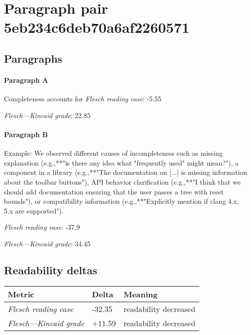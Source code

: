 \section{Paragraph pair 5eb234c6deb70a6af2260571}
\subsection{Paragraphs}
\paragraph{Paragraph A}
Completeness accounts for %
\emph{Flesch reading ease}: -5.55\par
\emph{Flesch---Kincaid grade}: 22.85

\paragraph{Paragraph B}
Example: We observed different causes of incompleteness such as missing explanation (e.g.,**"is there any idea what "frequently used" might mean?"), a component in a library (e.g.,**"The documentation on [...] is missing information about the toolbar buttons"), API behavior clarification (e.g.,**"I think that we should add documentation ensuring that the user passes a tree with reset bounds"), or compatibility information (e.g.,**"Explicitly mention if clang 4.x, 5.x are supported").\par\medskip
\emph{Flesch reading ease}: -37.9\par
\emph{Flesch---Kincaid grade}: 34.45

\subsection{Readability deltas}

\begin{tabular}{lll}
\toprule
               \textbf{Metric} & \textbf{Delta} &       \textbf{Meaning} \\
\midrule
    \emph{Flesch reading ease} &         -32.35 &  readability decreased \\
 \emph{Flesch---Kincaid grade} &         +11.59 &  readability decreased \\
\bottomrule
\end{tabular}

